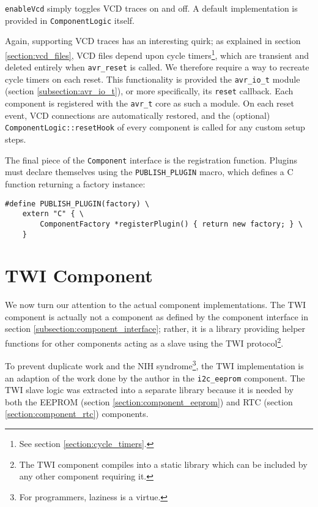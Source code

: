 \lstinline|enableVcd| simply toggles \ac{VCD} traces on and off. A default implementation
is provided in \lstinline|ComponentLogic| itself.

Again, supporting \simavr
\ac{VCD} traces has an interesting quirk; as explained in section \ref{section:vcd_files},
\ac{VCD} files depend upon \simavr cycle timers\footnote{
%
See section \ref{section:cycle_timers}.
%
}, which are transient and deleted entirely when \lstinline|avr_reset| is called.
We therefore require a way to recreate cycle timers on each reset. This functionality
is provided the \lstinline|avr_io_t| module (section \ref{subsection:avr_io_t}),
or more specifically, its \lstinline|reset| callback. Each component is registered
with the \lstinline|avr_t| core as such a module. On each reset event,
\ac{VCD} connections are automatically restored, and the (optional)
\lstinline|ComponentLogic::resetHook| of every component is called for any
custom setup steps.

The final piece of the \lstinline|Component| interface is the registration function.
Plugins must declare themselves using the \lstinline|PUBLISH_PLUGIN| macro,
which defines a C function returning a factory instance:

\begin{lstlisting}
#define PUBLISH_PLUGIN(factory) \
    extern "C" { \
        ComponentFactory *registerPlugin() { return new factory; } \
    }
\end{lstlisting}


\section{\acs{TWI} Component} \label{section:component_twi}

We now turn our attention to the actual component implementations. The \ac{TWI}
component is actually not a component as defined by the component interface in
section \ref{subsection:component_interface}; rather, it is a library providing
helper functions for other components acting as a slave
using the \ac{TWI} protocol\footnote{
%
The \ac{TWI} component compiles into a static library which can be included
by any other component requiring it.
%
}.

To prevent duplicate work and the \ac{NIH} syndrome\footnote{
%
For programmers, laziness is a virtue.
%
}, the \ac{TWI} implementation is an adaption of the work done by the \simavr
author in the \verb|i2c_eeprom| component. The \ac{TWI} slave logic was extracted
into a separate library because it is needed by both the \ac{EEPROM}
(section \ref{section:component_eeprom}) and \ac{RTC} (section \ref{section:component_rtc})
components.

